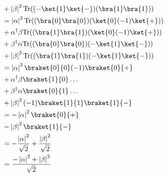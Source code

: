 \documentclass{article}
\newcommand{\trace}{{\rm Tr}}
\newcommand{\abs}[1]{\left\lvert #1 \right\rvert}
\begin{document}
\begin{enumerate}
\begin{enumerate}
$$\begin{aligned}
                                                              & + \abs{\beta}^2\trace((-\ket{1}\ket{-})(\bra{1}\bra{1}))                                                           \\
                                                              & = \abs{\alpha}^2\trace((\bra{0}\bra{0})(\ket{0}(-1)\ket{+}))                                                       \\
                                                              & + \alpha^\dagger\beta\trace((\bra{1}\bra{1})(\ket{0}(-1)\ket{+}))                                                  \\
                                                              & + \beta^\dagger\alpha\trace((\bra{0}\bra{0})(-\ket{1}\ket{-}))                                                     \\
                                                              & + \abs{\beta}^2\trace((\bra{1}\bra{1})(-\ket{1}\ket{-}))                                                           \\
                                                              & = \abs{\alpha}^2\braket{0}{0}(-1)\braket{0}{+}                                                                     \\
                                                              & + \alpha^\dagger\beta\braket{1}{0}\dots                                                                            \\
                                                              & + \beta^\dagger\alpha\braket{0}{1}\dots                                                                            \\
                                                              & + \abs{\beta}^2(-1)\braket{1}{1}\braket{1}{-}                                                                      \\
                                                              & = - \abs{\alpha}^2\braket{0}{+}                                                                                    \\
                                                              & - \abs{\beta}^2\braket{1}{-}                                                                                       \\
                                                              & = - \frac{\abs{\alpha}^2}{\sqrt{2}} + \frac{\abs{\beta}^2}{\sqrt{2}}                                               \\
                                                              & = \frac{-\abs{\alpha}^2+\abs{\beta}^2}{\sqrt{2}}                                                                   \\
                  \end{aligned}$$


\end{enumerate}
\end{enumerate}
\end{document}
